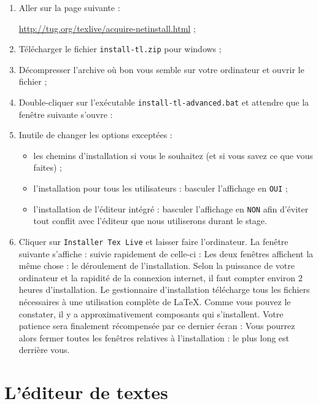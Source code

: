 \begin{enumerate}
    \item Aller sur la page suivante :\par \url{http://tug.org/texlive/acquire-netinstall.html} ;
    \item Télécharger le fichier {\tt install-tl.zip} pour windows ;
    \item Décompresser l'archive où bon vous semble sur votre ordinateur et ouvrir le fichier ;
    \item Double-cliquer sur l’exécutable {\tt install-tl-advanced.bat} et attendre que la fenêtre suivante s'ouvre :
    \item Inutile de changer les options exceptées :
     \begin{itemize}
        	\item les chemins d'installation si vous le souhaitez (et si vous savez ce que vous faites) ;
        	\item l'installation pour tous les utilisateurs : basculer l'affichage en {\tt OUI} ;
        	\item l'installation de l'éditeur intégré : basculer l'affichage en {\tt NON} afin d'éviter tout conflit avec l'éditeur que nous utiliserons durant le stage.
     \end{itemize}
    \item Cliquer sur {\tt Installer Tex Live} et laisser faire l'ordinateur. La fenêtre suivante s'affiche :
       	 suivie rapidement de celle-ci :
    Les deux fenêtres affichent la même chose : le déroulement de l'installation. Selon la puissance de votre ordinateur et la rapidité de la connexion internet, il faut compter environ 2 heures d'installation. Le gestionnaire d'installation télécharge tous les fichiers nécessaires à une utilisation complète de \LaTeX. Comme vous pouvez le constater, il y a approximativement  composants qui s'installent. Votre patience sera finalement récompensée par ce dernier écran :
       	 Vous pourrez alors fermer toutes les fenêtres relatives à l'installation \texlive : le plus long est derrière vous.
\end{enumerate}

\section{L'éditeur de textes}

